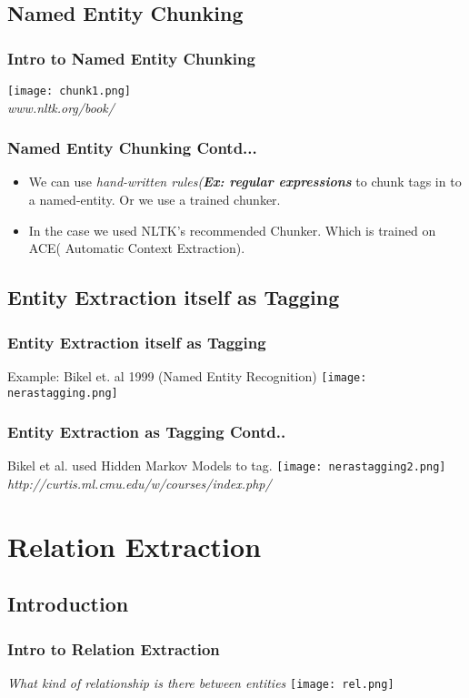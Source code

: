 \documentclass{beamer} %
\theoremstyle{definition} %
\begin{document}
\subsection[Chunking]{Named Entity Chunking}
\begin{frame}
\frametitle{Intro to Named Entity Chunking}
\texttt{[image: chunk1.png]}
\\
\textit{www.nltk.org/book/}
\end{frame}
\begin{frame}
\frametitle{Named Entity Chunking Contd...}
\begin{itemize}
\item We can use \textit{hand-written rules(\textbf{Ex: regular expressions}} to chunk tags in to a named-entity. Or we use a 
trained chunker.
\item In the case we used NLTK's recommended Chunker. Which is trained on ACE( Automatic
 Context Extraction).
 \end{itemize}
\end{frame}

\subsection[ER as Tagging]{Entity Extraction itself as Tagging}
\begin{frame}
\frametitle{Entity Extraction itself as Tagging}
Example: Bikel et. al 1999 (Named Entity Recognition)
\texttt{[image: nerastagging.png]}\\
\end{frame}
\begin{frame}
\frametitle{Entity Extraction as Tagging Contd..}
Bikel et al. used Hidden Markov Models to tag.
\texttt{[image: nerastagging2.png]}\\
\textit{http://curtis.ml.cmu.edu/w/courses/index.php/}
\end{frame}

\section[RE]{Relation Extraction}
\subsection{Introduction}
\begin{frame}
\frametitle{Intro to Relation Extraction}
\textit{What kind of relationship is there between entities}
\texttt{[image: rel.png]}
\end{frame}
\end{document}
